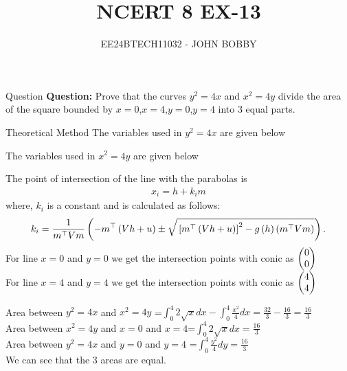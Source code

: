 \documentclass{beamer}
\begin{document}
\title{NCERT 8 EX-13}
\author{EE24BTECH11032 - JOHN BOBBY}
\date{}
\frame{\titlepage}
\begin{frame}{Question}
\textbf{Question:} Prove that the curves $y^2=4x$ and $x^2=4y$ divide the area of the square bounded by $x=0$,$x=4$,$y=0$,$y=4$ into $3$ equal parts.\\ 
\end{frame}
\begin{frame}{Theoretical Method}
The variables used in $y^2=4x$ are given below
\begin{table}[H]
    \centering
    
\end{table} 
The variables used in $x^2=4y$ are given below
\begin{table}[H]
    \centering
    
\end{table} 
\end{frame}
\begin{frame}{}
The point of intersection of the line with the parabolas is 
\begin{align}
    x_i = h + k_i m
\end{align}
where, $k_i$ is a constant and is calculated as follows:\\
\begin{align}
k_i = \frac{1}{m^\top Vm} \left(-m^\top \left(Vh + u\right) \pm \sqrt{{}\left[m^\top \left(Vh + u\right)\right]^2 - g\left(h\right)\left(m^\top Vm\right)}\right).
\end{align}
For line $x=0$ and $y=0$ we get the intersection points with conic  as $\begin{pmatrix}0 \\0\end{pmatrix}$ \\
For line $x=4$ and $y=4$ we get the intersection points with conic  as $\begin{pmatrix}4 \\4\end{pmatrix}$   
\end{frame}
\begin{frame}{}
Area between $y^2=4x$ and $x^2=4y$ =$\int_{0}^{4} 2\sqrt{x} dx-\int_{0}^{4} \frac{x^2}{4} dx=\frac{32}{3}-\frac{16}{3}=\frac{16}{3}$\\
Area between $x^2=4y$ and $x=0$ and $x=4$=$\int_{0}^{4} 2\sqrt{x} dx=\frac{16}{3}$\\
Area between $y^2=4x$ and $y=0$ and $y=4$ =$\int_{0}^{4} \frac{y^2}{4} dy=\frac{16}{3}$\\
We can see that the $3$ areas are equal.\\
\end{frame}
\end{document}
